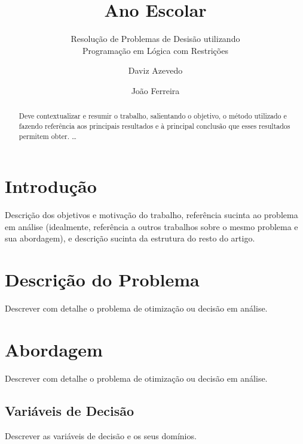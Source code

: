 \documentclass{llncs}
\begin{document}
%
\frontmatter          %
%
\pagestyle{headings}  %
%
\title{Ano Escolar}
\subtitle{Resolução de Problemas de Desisão utilizando\\
Programação em Lógica com Restrições}
%
%
\author{Daviz Azevedo \and João Ferreira}
%
%

\maketitle              %

\begin{abstract} %



Deve contextualizar e resumir o trabalho, salientando o objetivo, o
método utilizado e fazendo referência aos principais resultados e à principal conclusão que
esses resultados permitem obter. \dots
{}
\end{abstract}
%
\section{Introdução}
%
Descrição dos objetivos e motivação do trabalho, referência
sucinta ao problema em análise (idealmente, referência a outros trabalhos sobre o mesmo
problema e sua abordagem), e descrição sucinta da estrutura do resto do artigo.

\section{Descrição do Problema}
%
Descrever com detalhe o problema de otimização ou decisão em análise.

\section{Abordagem}
%
Descrever com detalhe o problema de otimização ou decisão em análise.

\subsection{Variáveis de Decisão}
Descrever as variáveis de decisão e os seus domínios.
\end{document}
